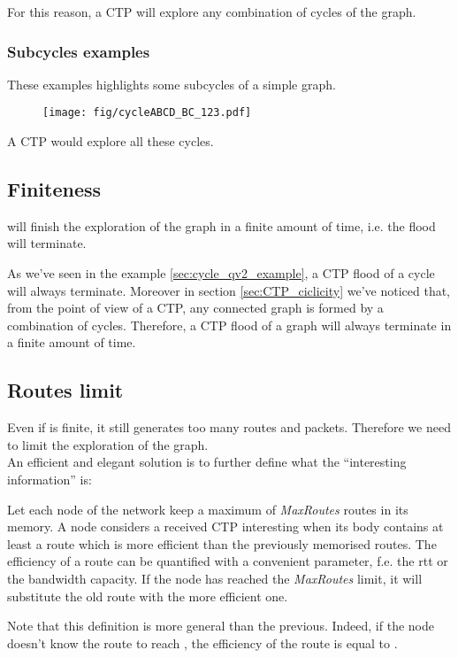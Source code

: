 \documentclass[a4paper]{article}
\begin{document}
For this reason, a CTP will explore any combination of cycles of the graph.

\subsubsection{Subcycles examples}
These examples highlights some subcycles of a simple graph.

\begin{figure}[h]
	\begin{center}
		\texttt{[image: fig/cycleABCD\_BC\_123.pdf]}
	\end{center}
\end{figure}
A CTP would explore all these cycles.

\subsection{Finiteness}
 will finish the exploration of the graph in a finite amount of time,
i.e. the flood will terminate.

As we've seen in the example \ref{sec:cycle_qv2_example}, a CTP flood of a
cycle will always terminate. Moreover in section \ref{sec:CTP_ciclicity} we've
noticed that, from the point of view of a CTP, any connected graph is formed
by a combination of cycles. Therefore, a CTP flood of a graph will always
terminate in a finite amount of time.

\subsection{Routes limit}
\label{sec:routes_limit}

Even if  is finite, it still generates too many routes and packets.
Therefore we need to limit the exploration of the graph.\\
An efficient and elegant solution is to further define what the ``interesting
information'' is:

Let each node of the network keep a maximum of \emph{MaxRoutes} routes in
its memory. A node considers a received CTP interesting when its body contains
at least a route which is more efficient than the previously memorised routes.
The efficiency of a route can be quantified with a convenient parameter, f.e.
the rtt or the bandwidth capacity.
If the node has reached the \emph{MaxRoutes} limit, it will substitute the old
route with the more efficient one.

Note that this definition is more general than the previous. Indeed, if the
node  doesn't know the route to reach , the efficiency of the route  is equal to .
\end{document}
